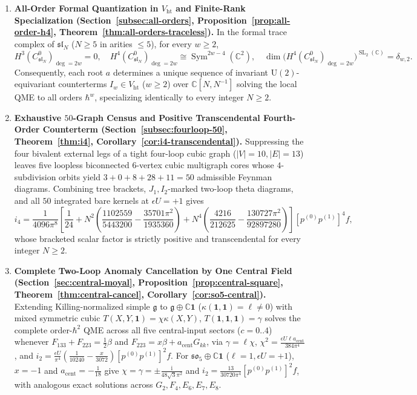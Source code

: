 \documentclass[11pt,letterpaper]{article}
\numberwithin{equation}{section}
\theoremstyle{plain}
\theoremstyle{definition}
\theoremstyle{remark}
\newcommand{\ii}{\mathrm{i}}
\newcommand{\fg}{\mathfrak{g}}
\newcommand{\fsl}{\mathfrak{sl}}
\newcommand{\fso}{\mathfrak{so}}
\newcommand{\Sym}{\operatorname{Sym}}
\newcommand{\SL}{\operatorname{SL}}
\newcommand{\Vht}{V_{\mathrm{ht}}}
\begin{document}
\begin{enumerate}[label=\textbf{Result~\arabic*.},leftmargin=*]
  \item \textbf{All-Order Formal Quantization in $\Vht$ and Finite-Rank Specialization (Section~\ref{subsec:all-orders}, Proposition~\ref{prop:all-order-h4}, Theorem~\ref{thm:all-orders-traceless}).} In the formal trace complex of $\fsl_N$ ($N \ge 5$ in arities $\le 5$), for every $w \ge 2$,
  \[
  H^3(C^0_{\fsl_N})_{\deg=2w} = 0,\quad
  H^4(C^0_{\fsl_N})_{\deg=2w} \cong \Sym^{2w-4}(\mathbb{C}^2),\quad
  \dim\!\big(H^4(C^0_{\fsl_N})_{\deg=2w}\big)^{\SL_2(\mathbb{C})} = \delta_{w,2}.
  \]
  Consequently, each root $a$ determines a unique sequence of invariant $\mathrm{U}(2)$-equivariant counterterms $I_w \in \Vht$ ($w \ge 2$) over $\mathbb{C}[N,N^{-1}]$ solving the local QME to all orders $\hbar^w$, specializing identically to every integer $N \ge 2$.

  \item \textbf{Exhaustive $50$-Graph Census and Positive Transcendental Fourth-Order Counterterm (Section~\ref{subsec:fourloop-50}, Theorem~\ref{thm:i4}, Corollary~\ref{cor:i4-transcendental}).} Suppressing the four bivalent external legs of a tight four-loop cubic graph ($|V|=10, |E|=13$) leaves five loopless biconnected $6$-vertex cubic multigraph cores whose $4$-subdivision orbits yield $3 + 0 + 8 + 28 + 11 = 50$ admissible Feynman diagrams. Combining tree brackets, $J_1,I_2$-marked two-loop theta diagrams, and all $50$ integrated bare kernels at $\epsilon U = +1$ gives
  \[
  i_4 = \frac{1}{4096\pi^8}\left[\frac{1}{24} + N^2\left(\frac{1102559}{5443200} - \frac{35701\pi^2}{1935360}\right) + N^4\left(\frac{4216}{212625} - \frac{130727\pi^2}{92897280}\right)\right][p^{(0)}p^{(1)}]^4 f,
  \]
  whose bracketed scalar factor is strictly positive and transcendental for every integer $N \ge 2$.

  \item \textbf{Complete Two-Loop Anomaly Cancellation by One Central Field (Section~\ref{sec:central-moyal}, Proposition~\ref{prop:central-square}, Theorem~\ref{thm:central-cancel}, Corollary~\ref{cor:so5-central}).} Extending Killing-normalized simple $\fg$ to $\fg \oplus \mathbb{C}\mathbf{1}$ ($\kappa(\mathbf{1},\mathbf{1}) = \ell \neq 0$) with mixed symmetric cubic $T(X,Y,\mathbf{1}) = \chi\kappa(X,Y)$, $T(\mathbf{1},\mathbf{1},\mathbf{1}) = \gamma$ solves the complete order-$\hbar^2$ QME across all five central-input sectors ($c = 0..4$) whenever $F_{133}+F_{223} = \frac{1}{2}\beta$ and $F_{223} = x\beta + a_{\mathrm{cent}}G_{kk}$, via $\gamma = \ell\chi$, $\chi^2 = \frac{\epsilon U\ell a_{\mathrm{cent}}}{384\pi^4}$, and $i_2 = \frac{\epsilon U}{\pi^4}(\frac{1}{10240}-\frac{x}{3072})[p^{(0)}p^{(1)}]^2 f$. For $\fso_5\oplus\mathbb{C}\mathbf{1}$ ($\ell=1, \epsilon U=+1$), $x = -1$ and $a_{\mathrm{cent}} = -\frac{1}{18}$ give $\chi = \gamma = \pm\frac{\ii}{48\sqrt{3}\pi^2}$ and $i_2 = \frac{13}{30720\pi^4}[p^{(0)}p^{(1)}]^2 f$, with analogous exact solutions across $G_2, F_4, E_6, E_7, E_8$.
\end{enumerate}
\end{document}
